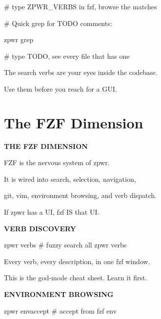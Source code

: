 \documentclass[11pt,a4paper,twoside]{book}
\begin{document}
\# type ZPWR\_VERBS in fzf, browse the matches

\# Quick grep for TODO comments:

\begin{codebox}
zpwr grep\\
\end{codebox}

\# type TODO, see every file that has one

The search verbs are your eyes inside the codebase.

Use them before you reach for a GUI.


\vspace{16pt}

\section{The FZF Dimension}


\vspace{10pt}
{\large\bfseries\color{neoncyan} THE FZF DIMENSION}\vspace{6pt}

\begin{codebox}
FZF is the nervous system of zpwr.\\
\end{codebox}

It is wired into search, selection, navigation,

git, vim, environment browsing, and verb dispatch.

\begin{codebox}
If zpwr has a UI, fzf IS that UI.\\
\end{codebox}


\vspace{12pt}
{\bfseries\color{neonyellow} VERB DISCOVERY}\vspace{4pt}

\begin{codebox}
zpwr verbs     \# fuzzy search all zpwr verbs\\
\end{codebox}

Every verb, every description, in one fzf window.

This is the god-mode cheat sheet. Learn it first.


\vspace{12pt}
{\bfseries\color{neonyellow} ENVIRONMENT BROWSING}\vspace{4pt}

\begin{codebox}
zpwr envaccept          \# accept from fzf env\\
\end{codebox}
\end{document}
